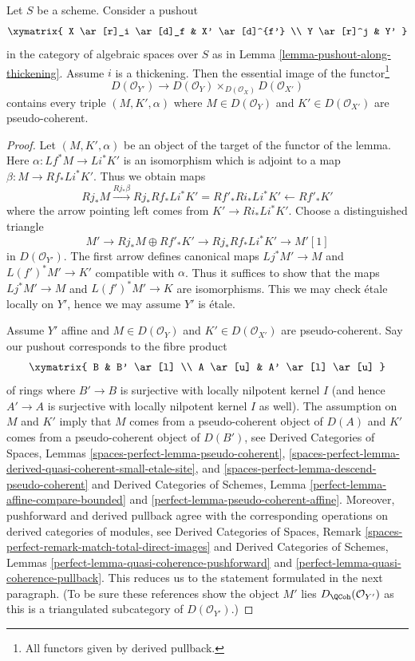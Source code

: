 \begin{lemma}
\label{lemma-pushout-along-thickening-derived}
Let $S$ be a scheme. Consider a pushout
$$
\xymatrix{
X \ar[r]_i \ar[d]_f & X' \ar[d]^{f'}
\\
Y \ar[r]^j & Y'
}
$$
in the category of algebraic spaces over $S$
as in Lemma \ref{lemma-pushout-along-thickening}.
Assume $i$ is a thickening. Then the essential
image of the functor\footnote{All functors given by derived pullback.}
$$
D(\mathcal{O}_{Y'}) \longrightarrow
D(\mathcal{O}_Y) \times_{D(\mathcal{O}_X)} D(\mathcal{O}_{X'})
$$
contains every triple $(M, K', \alpha)$ where $M \in D(\mathcal{O}_Y)$
and $K' \in D(\mathcal{O}_{X'})$ are pseudo-coherent.
\end{lemma}

\begin{proof}
Let $(M, K', \alpha)$ be an object of the target of the functor
of the lemma. Here $\alpha : Lf^*M \to Li^*K'$
is an isomorphism which is adjoint to a map $\beta : M \to Rf_*Li^*K'$.
Thus we obtain maps
$$
Rj_*M \xrightarrow{Rj_*\beta}
Rj_*Rf_*Li^*K' = Rf'_*Ri_*Li^*K' \leftarrow Rf'_*K'
$$
where the arrow pointing left comes from $K' \to Ri_*Li^*K'$.
Choose a distinguished triangle
$$
M' \to Rj_*M \oplus Rf'_*K' \to Rj_*Rf_*Li^*K' \to M'[1]
$$
in $D(\mathcal{O}_{Y'})$. The first arrow defines canonical maps
$Lj^*M' \to M$ and $L(f')^*M' \to K'$ compatible with $\alpha$.
Thus it suffices to show that the maps
$Lj^*M' \to M$ and $L(f')^*M' \to K$ are isomorphisms.
This we may check \'etale locally on $Y'$, hence we may
assume $Y'$ is \'etale.

\medskip\noindent
Assume $Y'$ affine and $M \in D(\mathcal{O}_Y)$
and $K' \in D(\mathcal{O}_{X'})$ are pseudo-coherent.
Say our pushout corresponds to the fibre product
$$
\xymatrix{
B & B' \ar[l] \\
A \ar[u] & A' \ar[l] \ar[u]
}
$$
of rings where $B' \to B$ is surjective with locally nilpotent kernel $I$
(and hence $A' \to A$ is surjective with locally nilpotent kernel $I$ as well).
The assumption on $M$ and $K'$ imply that $M$ comes from a pseudo-coherent
object of $D(A)$ and $K'$ comes from a pseudo-coherent object of $D(B')$, see
Derived Categories of Spaces, Lemmas
\ref{spaces-perfect-lemma-pseudo-coherent},
\ref{spaces-perfect-lemma-derived-quasi-coherent-small-etale-site}, and
\ref{spaces-perfect-lemma-descend-pseudo-coherent}
and
Derived Categories of Schemes, Lemma
\ref{perfect-lemma-affine-compare-bounded} and
\ref{perfect-lemma-pseudo-coherent-affine}.
Moreover, pushforward and derived pullback agree with the
corresponding operations on derived categories of modules, see
Derived Categories of Spaces, Remark
\ref{spaces-perfect-remark-match-total-direct-images}
and
Derived Categories of Schemes, Lemmas
\ref{perfect-lemma-quasi-coherence-pushforward} and
\ref{perfect-lemma-quasi-coherence-pullback}.
This reduces us to the statement formulated in the next paragraph.
(To be sure these references show
the object $M'$ lies $D_\QCoh(\mathcal{O}_{Y'})$
as this is a triangulated subcategory of $D(\mathcal{O}_{Y'})$.)


\end{proof}
